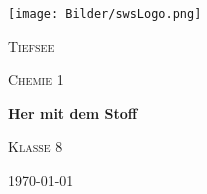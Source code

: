 \begin{figure}[htbp]
    \begin{minipage}[t]{7.8cm}
        \vspace{0pt}
        \texttt{[image: Bilder/swsLogo.png]}
    
        {\scshape\LARGE Tiefsee \par}
    \end{minipage}
    \begin{minipage}[t]{7.8cm}
        \vspace{0.7cm}
        {\scshape\Large Chemie 1\par}
        \vspace{0.65cm}
        {\huge\bfseries Her mit dem Stoff\par}
        \vspace{0.15cm}
        {\scshape\Large Klasse 8\par}
        \flushright    
        {\large \today\par}
    \end{minipage}
\end{figure} 